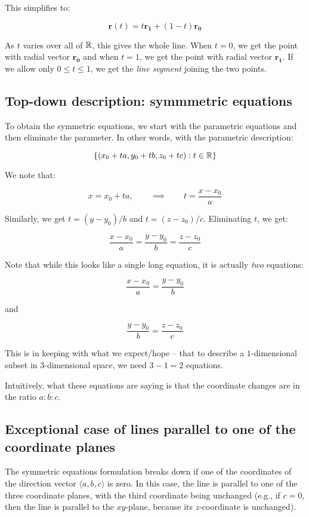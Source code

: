 \documentclass[10pt]{amsart}
\begin{document}
This simplifies to:

$$\mathbf{r}(t) = t\mathbf{r_1} + (1 - t)\mathbf{r_0}$$

As $t$ varies over all of $\mathbb{R}$, this gives the whole line. When $t =
0$, we get the point with radial vector $\mathbf{r_0}$ and when $t = 1$,
we get the point with radial vector $\mathbf{r_1}$. If we allow only $0
\le t \le 1$, we get the {\em line segment} joining the two points.

\subsection{Top-down description: symmmetric equations}

To obtain the symmetric equations, we start with the parametric
equations and then eliminate the parameter. In other words, with the
parametric description:

$$\{ (x_0 + ta, y_0 + tb, z_0 + tc) : t \in \mathbb{R} \}$$

We note that:

$$x = x_0 + ta, \qquad \implies \qquad t = \frac{x - x_0}{a}$$

Similarly, we get $t = (y - y_0)/b$ and $t = (z - z_0)/c$. Eliminating
$t$, we get:

$$\frac{x - x_0}{a} = \frac{y - y_0}{b} = \frac{z - z_0}{c}$$

Note that while this looks like a single long equation, it is actually
{\em two} equations:

$$\frac{x - x_0}{a} = \frac{y - y_0}{b}$$

and

$$\frac{y - y_0}{b} = \frac{z - z_0}{c}$$

This is in keeping with what we expect/hope -- that to describe a
$1$-dimensional subset in $3$-dimensional space, we need $3 - 1 = 2$
equations.

Intuitively, what these equations are saying is that the coordinate
changes are in the ratio $a:b:c$.

\subsection{Exceptional case of lines parallel to one of the coordinate planes}

The symmetric equations formulation breaks down if one of the
coordinates of the direction vector $\langle a,b,c \rangle$ is
zero. In this case, the line is parallel to one of the three
coordinate planes, with the third coordinate being unchanged (e.g., if
$c = 0$, then the line is parallel to the $xy$-plane, because its
$z$-coordinate is unchanged).
\end{document}

